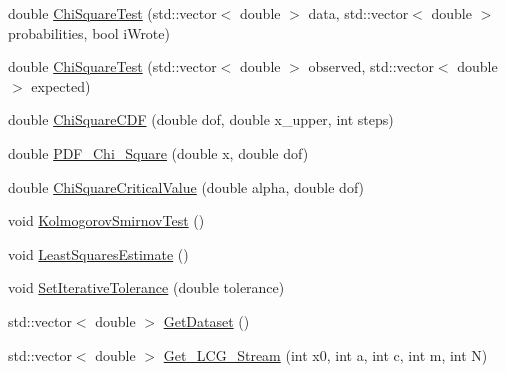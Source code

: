 \begin{DoxyCompactItemize}
double \hyperlink{class_statistics_object_a5f516a6f544714694efc0ba0f925f38c}{Chi\+Square\+Test} (std\+::vector$<$ double $>$ data, std\+::vector$<$ double $>$ probabilities, bool i\+Wrote)
\item 
double \hyperlink{class_statistics_object_a6b3b58d412c68407195df629e2343c6d}{Chi\+Square\+Test} (std\+::vector$<$ double $>$ observed, std\+::vector$<$ double $>$ expected)
\item 
double \hyperlink{class_statistics_object_a7ad5fc88ce637ed421f4fccf92a8b5e0}{Chi\+Square\+C\+DF} (double dof, double x\+\_\+upper, int steps)
\item 
double \hyperlink{class_statistics_object_aec6848499139f4811fd4f2f60a252a9f}{P\+D\+F\+\_\+\+Chi\+\_\+\+Square} (double x, double dof)
\item 
double \hyperlink{class_statistics_object_aa4d91e7d45164eb8a3849c1c7df585e1}{Chi\+Square\+Critical\+Value} (double alpha, double dof)
\item 
void \hyperlink{class_statistics_object_aedec675916379850f8d53897cf5386b1}{Kolmogorov\+Smirnov\+Test} ()
\item 
void \hyperlink{class_statistics_object_a14eb03b68eaa7a26769390ff81915a25}{Least\+Squares\+Estimate} ()
\item 
void \hyperlink{class_statistics_object_ae820e4df3a29f2627a4ba5c3ac0b7862}{Set\+Iterative\+Tolerance} (double tolerance)
\item 
std\+::vector$<$ double $>$ \hyperlink{class_statistics_object_a38f772ec93c2e0631cb101aff8296b54}{Get\+Dataset} ()
\item 
std\+::vector$<$ double $>$ \hyperlink{class_statistics_object_a983e11b6d3562ae303f5cc925be448e2}{Get\+\_\+\+L\+C\+G\+\_\+\+Stream} (int x0, int a, int c, int m, int N)
\end{DoxyCompactItemize}
